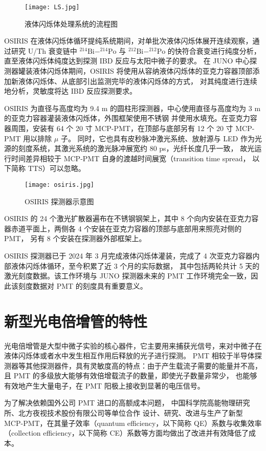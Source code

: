 \begin{figure}
    \centering
    \texttt{[image: LS.jpg]}
    \caption{液体闪烁体处理系统的流程图}
\end{figure}

OSIRIS 在液体闪烁体循环提纯系统期间，对单批次液体闪烁体展开连续观察，通过研究 U/Th 衰变链中 $^{214}\text{Bi}-^{214}\text{Po}$ 与 
$^{212}\text{Bi}-^{212}\text{Po}$ 的快符合衰变进行纯度分析，直至液体闪烁体纯度达到探测 IBD 反应与太阳中微子的要求。
在 JUNO 中心探测器罐装液体闪烁体期间，OSIRIS 将使用从容纳液体闪烁体的亚克力容器顶部添加新液体闪烁体、从底部引出监测完毕的液体闪烁体的方式，
对其纯度进行连续地分析，灵敏度将达 IBD 反应探测要求。

OSIRIS 为直径与高度均为 9.4 m 的圆柱形探测器，中心使用直径与高度均为 3 m 的亚克力容器灌装液体闪烁体，外围框架使用不锈钢
并使用水填充。在亚克力容器周围，安装有 64 个 20 寸 MCP-PMT，在顶部与底部另有 12 个 20 寸 MCP-PMT 用以排除 $\mu$ 子。
同时，它也具有皮秒脉冲激光系统、放射源与 LED 作为光源的刻度系统，其激光系统的激光脉冲展宽约 80 ps，光纤长度几乎一致，
故光运行时间差异相较于 MCP-PMT 自身的渡越时间展宽（transition time spread， 以下简称 TTS）可以忽略。

\begin{figure}
    \centering
    \texttt{[image: osiris.jpg]}
    \caption{OSIRIS 探测器示意图}
\end{figure}

OSIRIS 的 24 个激光扩散器遍布在不锈钢钢架上，其中 8 个向内安装在亚克力容器赤道平面上，两侧各 4 个安装在亚克力容器的顶部与底部用来照亮对侧的 PMT，
另有 8 个安装在探测器外部框架上。

OSIRIS 探测器已于 2024 年 3 月完成液体闪烁体灌装，完成了 4 次亚克力容器内部液体闪烁体循环，至今积累了近 3 个月的实际数据，
其中包括两轮共计 5 天的激光刻度数据。该工作环境与 JUNO 探测器未来的 PMT 工作环境完全一致，因此该刻度数据对 PMT 的刻度具有重要意义。

\section{新型光电倍增管的特性}
光电倍增管是大型中微子实验的核心器件，它主要用来捕获光信号，来对中微子在液体闪烁体或者水中发生相互作用后释放的光子进行探测。
PMT 相较于半导体探测器等其他探测器件，具有灵敏度高的特点：由于产生载流子需要的能量并不高，
且 PMT 的多级放大能够有效倍增载流子的数量，即使光子数量非常少，
也能够有效地产生大量电子，在 PMT 阳极上接收到显著的电压信号。

为了解决依赖国外公司 PMT 进口的高额成本问题，
中国科学院高能物理研究所、北方夜视技术股份有限公司等单位合作
设计、研究、改进与生产了新型 MCP-PMT，在其量子效率（quantum efficiency，以下简称 QE）系数与收集效率
（collection efficiency，以下简称 CE）系数等方面均做出了改进\cite{wangNewDesignLarge2012}并有效降低了成本。

